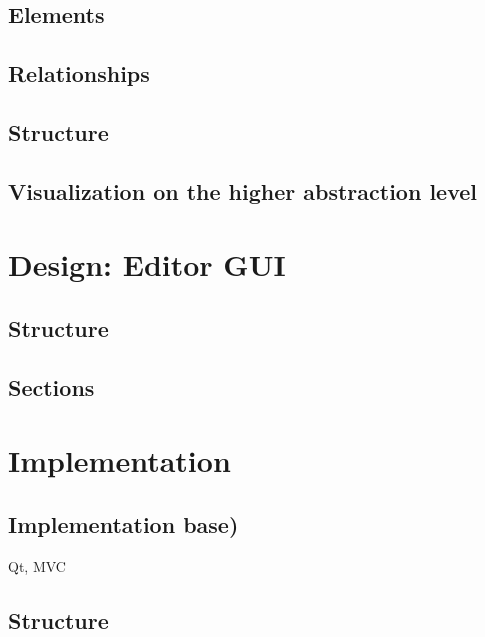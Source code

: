 \documentclass[twoside, openright, 12pt]{book}
\begin{document}
\section{Elements}
\label{gsl_elements}


\section{Relationships}
\label{gsl_relationships}


\section{Structure}
\label{gsl_structure}


\section{Visualization on the higher abstraction level}
\label{higher_abstraction_level}




\cleardoublepage
\chapter{Design: Editor GUI}
\label{editor_design}


\section{Structure}
\label{editor_structure}


\section{Sections}
\label{editor_sections}




\cleardoublepage
\chapter{Implementation}
\label{implementation}
	
	
\section{Implementation base)}
\label{implementation_base}
Qt, MVC

\section{Structure}
\label{implementation_structure}
	
\end{document}
